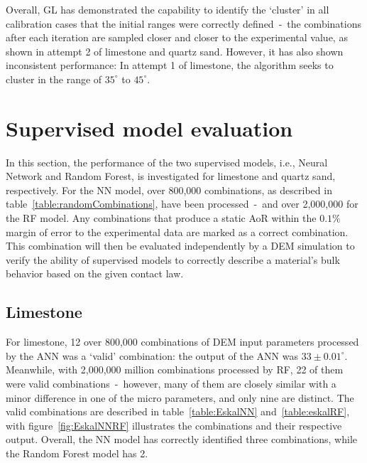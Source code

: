 Overall, GL has demonstrated the capability to identify the `cluster' in all calibration cases that the initial ranges were correctly defined~-~the combinations after each iteration are sampled closer and closer to the experimental value, as shown in attempt 2 of limestone and quartz sand. However, it has also shown inconsistent performance: In attempt 1 of limestone, the algorithm seeks to cluster in the range of $35^{\circ}$ to $45^{\circ}$. 


\section{Supervised model evaluation}\label{section:supervisedPerformance}

In this section, the performance of the two supervised models, i.e., Neural Network and Random Forest, is investigated for limestone and quartz sand, respectively. For the NN model, over 800,000 combinations, as described in table~\ref{table:randomCombinations}, have been processed~-~and over 2,000,000 for the RF model. Any combinations that produce a static AoR within the $0.1\%$ margin of error to the experimental data are marked as a correct combination. This combination will then be evaluated independently by a DEM simulation to verify the ability of supervised models to correctly describe a material's bulk behavior based on the given contact law. 

\begin{table}[H]
    \centering
    \caption{Random evenly-spaced microparameters combinations}\label{table:randomCombinations}
\end{table}
    
\subsection{Limestone}

For limestone, 12 over 800,000 combinations of DEM input parameters processed by the ANN was a `valid' combination: the output of the ANN was $33\pm 0.01^{\circ}$. Meanwhile, with 2,000,000 million combinations processed by RF, 22 of them were valid combinations~-~however, many of them are closely similar with a minor difference in one of the micro parameters, and only nine are distinct. The valid combinations are described in table~\ref{table:EskalNN} and~\ref{table:eskalRF}, with figure~\ref{fig:EskalNNRF} illustrates the combinations and their respective output. Overall, the NN model has correctly identified three combinations, while the Random Forest model has 2. 


